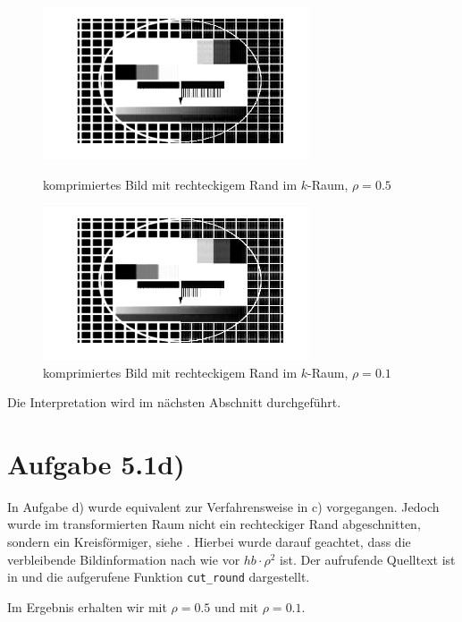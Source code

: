 \begin{figure}[htb]
\centering
  \includegraphics[width=0.7\textwidth,keepaspectratio]{../tmp/eins_c_0_5}
  \caption{komprimiertes Bild mit rechteckigem Rand im $k$-Raum, $ρ=0.5$}
  \label{fig:1c5}
  \includegraphics[width=0.7\textwidth,keepaspectratio]{../tmp/eins_c_0_1}
  \caption{komprimiertes Bild mit rechteckigem Rand im $k$-Raum, $ρ=0.1$}
  \label{fig:1c1}
\end{figure}

Die Interpretation wird im nächsten Abschnitt durchgeführt.

\section*{Aufgabe 5.1d)}

In Aufgabe d) wurde equivalent zur Verfahrensweise in c) vorgegangen.
Jedoch wurde im transformierten Raum nicht ein rechteckiger Rand abgeschnitten,
sondern ein Kreisförmiger, siehe . Hierbei wurde darauf geachtet, dass die verbleibende
Bildinformation nach wie vor $hb\cdot ρ^2$ ist. Der aufrufende Quelltext ist in  und 
die aufgerufene Funktion \texttt{cut\_round} dargestellt.




Im Ergebnis erhalten wir  mit $ρ=0.5$ und  mit $ρ=0.1$.


